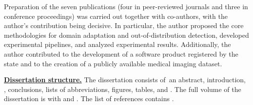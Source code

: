 Preparation of the seven publications (four in peer-reviewed journals and three in conference proceedings) was carried out together with co-authors, with the author’s contribution being decisive. In particular, the author proposed the core methodologies for domain adaptation and out-of-distribution detection, developed experimental pipelines, and analyzed experimental results. Additionally, the author contributed to the development of a software product registered by the state and to the creation of a publicly available medical imaging dataset.


\underline{\textbf{Dissertation structure.}}
The dissertation consists of~an abstract, introduction, , conclusions, lists of abbreviations, figures, tables, and . The full volume of the dissertation is  with  and . The list of references contains .

